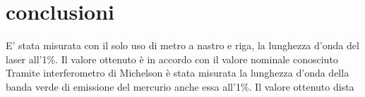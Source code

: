 \section{conclusioni}
E' stata misurata con il solo uso di metro a nastro e riga, la lunghezza d'onda del laser all'1\%. Il valore ottenuto è in accordo con il valore nominale conosciuto\\
Tramite interferometro di Michelson è stata misurata la lunghezza d'onda della banda verde di emissione del mercurio anche essa all'1\%. Il valore ottenuto dista 
